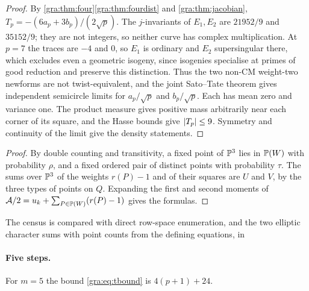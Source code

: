 \begin{proof}
By \cref{gra:thm:four}\ref{gra:thm:fourdist} and \cref{gra:thm:jacobian},
$T_p=-(6a_p+3b_p)/(2\sqrt p)$. The $j$-invariants of $E_1,E_2$ are
$21952/9$ and $35152/9$; they are not integers, so neither curve has
complex multiplication. At $p=7$ the traces are $-4$ and $0$, so $E_1$ is
ordinary and $E_2$ supersingular there, which excludes even a geometric
isogeny, since isogenies specialise at primes of good reduction and
preserve this distinction. Thus the two non-CM weight-two newforms are not
twist-equivalent, and the joint Sato--Tate theorem
\cite[Theorem~1.2]{Thorner2021Effective} gives independent semicircle
limits for $a_p/\sqrt p$ and $b_p/\sqrt p$. Each has mean zero and variance
one. The product measure gives positive mass arbitrarily near each corner
of its square, and the Hasse bounds give $\lvert T_p\rvert\le9$. Symmetry and
continuity of the limit give the density statements.
\end{proof}


\begin{proof}
By double counting and transitivity, a fixed point of $\mathbb{P}^3$ lies in
$\mathbb{P}(W)$ with probability $\rho$, and a fixed ordered pair of distinct
points with probability $\tau$. The sums over $\mathbb{P}^3$ of the weights
$r(P)-1$ and of their squares are $U$ and $V$, by the three types of points
on $Q$. Expanding the first and second moments of
$\mathcal{A}/2=u_k+\sum_{P\in\mathbb{P}(W)}(r(P)-1)$ gives the formulas.
\end{proof}

\noindent The census is compared with direct row-space enumeration, and the
two elliptic character sums with point counts from the defining equations,
in

\paragraph{Five steps.}
For $m=5$ the bound \eqref{gra:eq:tbound} is $4(p+1)+24$.

